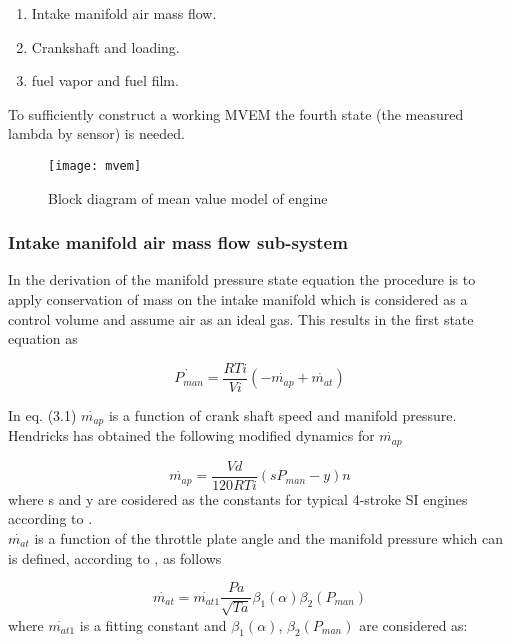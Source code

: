 \begin{enumerate}
\item Intake manifold air mass flow.
\item Crankshaft and loading.
\item fuel vapor and fuel film.
\end{enumerate}
To sufficiently construct a working MVEM the fourth state (the measured lambda by sensor) is needed. 

\begin{figure}[H]
    \centering
    \texttt{[image: mvem]}
    \caption{Block diagram of mean value model of engine \cite{lambdacontrol}}
    \label{fig:feedback}
\end{figure}
  
\subsubsection{Intake manifold air mass flow sub-system}

In the derivation of the manifold pressure state equation the procedure is to apply conservation of mass on the intake manifold which is considered as a control volume and assume air as an ideal gas. This results in the first state equation as

\begin{equation}
\dot{P_{man}}=\frac{RTi}{Vi}(- \dot{m_{ap}} + \dot{m_{at}})
\end{equation}

In eq. (3.1) $\dot{m_{ap}}$ is a function of crank shaft speed and manifold pressure. Hendricks has obtained the following modified dynamics for $\dot{m_{ap}}$ \cite{manifold} 

\begin{equation}
\dot{m_{ap}}=\frac{Vd}{120RTi}(sP_{man}-y)n
\end{equation}
where s and y are cosidered as the constants for typical 4-stroke SI engines according to \cite{manifold}.
\\

$\dot{m_{at}}$ is a function of the throttle plate angle and the manifold pressure which can is defined, according to \cite{manifold}, as follows

\begin{equation}
\dot{m_{at}}=\dot{m_{at1}}\frac{Pa}{\sqrt{Ta}}\beta_{1}(\alpha)\beta_{2}(P_{man})
\end{equation}
where $\dot{m_{at1}}$ is a fitting constant and $\beta_{1}(\alpha)$, $\beta_{2}(P_{man})$ are considered as:

